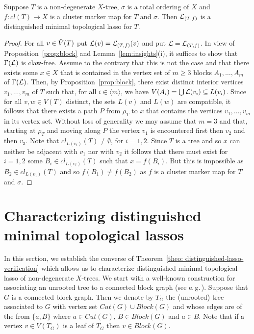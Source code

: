 \begin{thm}\label{theo: distinguished-lasso-verification}
Suppose $T$ is a non-degenerate  $X$-tree, 
$\sigma$ is a total ordering of $X$ and $f:cl(T)\to X$ is a cluster
marker map for $T$ and $\sigma$. Then 
${\mathcal L}_{(T,f)}$ is a distinguished minimal topological lasso for $T$.
\end{thm}
 \begin{proof}
For all $v\in \mathring{V}(T)$ put ${\mathcal L}(v) = {\mathcal L}_{(T,f)}(v)$ and
put ${\mathcal L}={\mathcal L}_{(T,f)}$.
In view of Proposition~\ref{prop:block} and Lemma~\ref{lem:insights}(i), 
it suffices to show that $\Gamma({\mathcal L})$ is claw-free.
 Assume to the contrary that this is not the case and that there
exists some $x\in X$ that is contained in the vertex set of $m\geq 3$
blocks $A_1,\ldots,A_m$ of $\Gamma({\mathcal L})$. Then, by 
Proposition~\ref{prop:block},
 there  exist distinct interior vertices $v_1, \ldots, v_m$ of $T$ such that,
 for all $i\in\langle m\rangle$, we have 
$V(A_i)=\bigcup{\mathcal L}(v_i)\subseteq L(v_i)$. 
Since for all
$v,w\in V(T)$ distinct, the sets $L(v)$ and $L(w)$ are compatible,  
it follows that there exists a path $P$ from
$\rho_T$ to $x$ that contains the vertices $v_1,\ldots, v_m$ in its
vertex set. Without loss of generality we may assume that
$m=3$ and that, starting at $\rho_T$ and moving along $P$ 
the vertex $v_1$ is encountered first
then $v_2$ and then $v_3$. Note that 
$cl_{L(v_i)}(T)\not=\emptyset$, for $i=1,2$.
Since $T$ is a tree and so $x$ can neither be adjacent with 
$v_1$ nor with $v_2$ it follows that 
there must exist for $i=1,2$  some $B_i\in cl_{L(v_i)}(T)$ 
such that $x=f(B_i)$. But this is impossible as 
$B_2\in cl_{L(v_1)}(T)$ and so $f(B_1)\not=f(B_2)$ 
as $f$ is a cluster marker map for $T$ and $\sigma$.
\qquad \end{proof}
 

\section{Characterizing distinguished minimal topological 
lassos}\label{sec:characterization-distinguished}

In this section, we establish the converse of 
Theorem~\ref{theo: distinguished-lasso-verification}
which allows us to characterize 
distinguished minimal topological lasso of non-degenerate $X$-trees. 
We start with a well-known construction
for associating  an unrooted tree to a 
connected block graph (see e.\,g.\,\cite{diestel}).
Suppose that $G$ is a connected block graph. Then
we denote by $T_G$ the (unrooted) tree associated to $G$
with vertex set $Cut(G)\cup Block(G)$
and whose edges are of the from $\{a,B\}$ where $a\in Cut(G)$,
$B\in Block(G)$ and $a\in B$. Note that
if a vertex
$v\in V(T_G)$ is a leaf of $T_G$ then $v\in Block(G)$.

